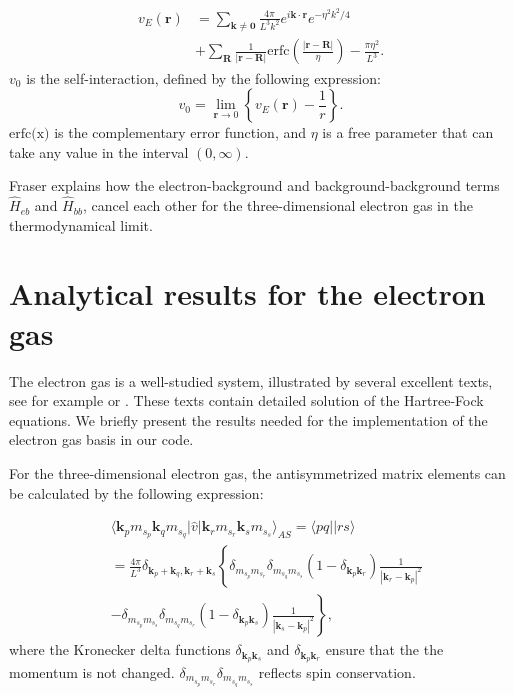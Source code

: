\documentclass[twoside,english]{uiofysmaster}
\begin{document}
\begin{align}\label{selfinter}
v_{E}(\mathbf{r}) &= \sum_{\mathbf{k} \neq \mathbf{0}}
\frac{4\pi }{L^{3}k^{2}}e^{i\mathbf{k}\cdot \mathbf{r}}
e^{-\eta^{2}k^{2}/4} \nonumber \\
&+ \sum_{\mathbf{R}}\frac{1}{\left| \mathbf{r}
	-\mathbf{R}\right| } \mathrm{erfc} \left( \frac{\left| 
	\mathbf{r}-\mathbf{R}\right|}{\eta }\right)
- \frac{\pi \eta^{2}}{L^{3}}.
\end{align}
$v_{0}$ is the self-interaction, defined by the following expression: 
\begin{equation}
v_{0} = \lim_{\mathbf{r} \rightarrow 0} \left\{ v_{E}(\mathbf{r}) - \frac{1}{r} \right\}.
\end{equation}
$\text{erfc(x)}$ is the complementary error function, and $\eta$ is a free parameter that can take any value in the interval $(0,\infty)$. 

Fraser \cite{FraserFinitesizeeffectsCoulomb1996} explains how the electron-background and background-background terms $\hat{H}_{eb}$ and $\hat{H}_{bb}$, cancel each other for the three-dimensional electron gas in the thermodynamical limit.


\section{Analytical results for the electron gas}

The electron gas is a well-studied system, illustrated by  several excellent texts, see for example
\cite{GrossManyparticletheory1991} or
\cite{S.KvaalLectureNotesFysKjm44802015}. These texts contain detailed solution of
the Hartree-Fock equations. We briefly present the results needed for the
implementation of the electron gas basis in our code.

For the three-dimensional electron gas, the antisymmetrized matrix elements can be calculated by the following expression:

\begin{align}\label{TBMEHEG} \tag{5}
& \langle \mathbf{k}_{p}m_{s_{p}}\mathbf{k}_{q}m_{s_{q}}
|\hat{v}|\mathbf{k}_{r}m_{s_{r}}\mathbf{k}_{s}m_{s_{s}}\rangle_{AS} = \langle pq||rs \rangle
\nonumber \\
& = \frac{4\pi }{L^{3}}\delta_{\mathbf{k}_{p}+\mathbf{k}_{q},
	\mathbf{k}_{r}+\mathbf{k}_{s}}\left\{ 
\delta_{m_{s_{p}}m_{s_{r}}}\delta_{m_{s_{q}}m_{s_{s}}}
\left( 1 - \delta_{\mathbf{k}_{p}\mathbf{k}_{r}}\right) 
\frac{1}{|\mathbf{k}_{r}-\mathbf{k}_{p}|^{2}}
\right. \nonumber \\
& \left. - \delta_{m_{s_{p}}m_{s_{s}}}\delta_{m_{s_{q}}m_{s_{r}}}
\left( 1 - \delta_{\mathbf{k}_{p}\mathbf{k}_{s}} \right)
\frac{1}{|\mathbf{k}_{s}-\mathbf{k}_{p}|^{2}} 
\right\} ,
\end{align}
where the Kronecker delta functions $\delta_{\mathbf{k}_{p}\mathbf{k}_{s}}$  and $\delta_{\mathbf{k}_{p}\mathbf{k}_{r}}$ ensure that the the momentum is not changed. $\delta_{m_{s_{p}}m_{s_{r}}}\delta_{m_{s_{q}}m_{s_{s}}}$ reflects spin conservation.
\end{document}
